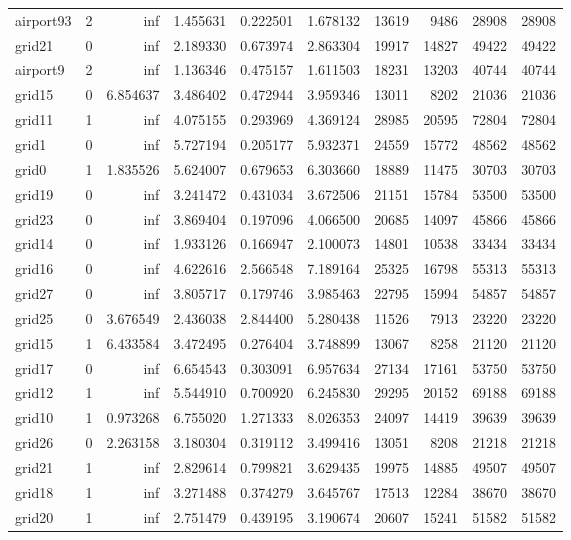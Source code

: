 \begin{longtable}{|l|r|r|r|r|r|r|r|r|r|}
airport93 & 2 & inf & 1.455631 & 0.222501 & 1.678132 & 13619 & 9486 & 28908 & 28908 \\
grid21 & 0 & inf & 2.189330 & 0.673974 & 2.863304 & 19917 & 14827 & 49422 & 49422 \\
airport9 & 2 & inf & 1.136346 & 0.475157 & 1.611503 & 18231 & 13203 & 40744 & 40744 \\
grid15 & 0 & 6.854637 & 3.486402 & 0.472944 & 3.959346 & 13011 & 8202 & 21036 & 21036 \\
grid11 & 1 & inf & 4.075155 & 0.293969 & 4.369124 & 28985 & 20595 & 72804 & 72804 \\
grid1 & 0 & inf & 5.727194 & 0.205177 & 5.932371 & 24559 & 15772 & 48562 & 48562 \\
grid0 & 1 & 1.835526 & 5.624007 & 0.679653 & 6.303660 & 18889 & 11475 & 30703 & 30703 \\
grid19 & 0 & inf & 3.241472 & 0.431034 & 3.672506 & 21151 & 15784 & 53500 & 53500 \\
grid23 & 0 & inf & 3.869404 & 0.197096 & 4.066500 & 20685 & 14097 & 45866 & 45866 \\
grid14 & 0 & inf & 1.933126 & 0.166947 & 2.100073 & 14801 & 10538 & 33434 & 33434 \\
grid16 & 0 & inf & 4.622616 & 2.566548 & 7.189164 & 25325 & 16798 & 55313 & 55313 \\
grid27 & 0 & inf & 3.805717 & 0.179746 & 3.985463 & 22795 & 15994 & 54857 & 54857 \\
grid25 & 0 & 3.676549 & 2.436038 & 2.844400 & 5.280438 & 11526 & 7913 & 23220 & 23220 \\
grid15 & 1 & 6.433584 & 3.472495 & 0.276404 & 3.748899 & 13067 & 8258 & 21120 & 21120 \\
grid17 & 0 & inf & 6.654543 & 0.303091 & 6.957634 & 27134 & 17161 & 53750 & 53750 \\
grid12 & 1 & inf & 5.544910 & 0.700920 & 6.245830 & 29295 & 20152 & 69188 & 69188 \\
grid10 & 1 & 0.973268 & 6.755020 & 1.271333 & 8.026353 & 24097 & 14419 & 39639 & 39639 \\
grid26 & 0 & 2.263158 & 3.180304 & 0.319112 & 3.499416 & 13051 & 8208 & 21218 & 21218 \\
grid21 & 1 & inf & 2.829614 & 0.799821 & 3.629435 & 19975 & 14885 & 49507 & 49507 \\
grid18 & 1 & inf & 3.271488 & 0.374279 & 3.645767 & 17513 & 12284 & 38670 & 38670 \\
grid20 & 1 & inf & 2.751479 & 0.439195 & 3.190674 & 20607 & 15241 & 51582 & 51582 \\

\end{longtable}
